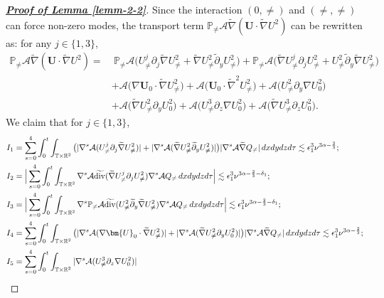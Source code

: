 \documentclass[11pt,reqno]{article}
\numberwithin{equation}{section}
\newcommand\R{{\mathbb R}}
\newcommand\T{{\mathbb T}}
\newcommand\PP{{\mathbb P}}
\newcommand\A{\mathcal{A}}
\newcommand\U{\bm{U}}
\let\pa=\partial
\let\al=\alpha
\let\f=\frac
\let\ep=\epsilon
\def\dive{\mathop{\rm div}\nolimits}
\begin{document}
\begin{proof}[\underline{\textbf{Proof of Lemma \ref{lemm-2-2}}}]
Since the interaction $(0,\not=)$ and $(\not=,\not=)$ can force non-zero modes, the transport term $\PP_{\not=}\A\widetilde{\nabla}(\U\cdot\widetilde{\nabla}U^2)$ can be rewritten as: for any $j\in\{1,3\}$,
\begin{align*}
	\PP_{\not=}\A\widetilde{\nabla}(\U\cdot\widetilde{\nabla}U^2)
	=&~	\PP_{\not=}\A\big(U_{\not=}^j\pa_{j}\widetilde{\nabla}U_{\not=}^2
	+\widetilde{\nabla}U_{\not=}^2\widetilde{\pa}_y U_{\not=}^2\big)
	+\PP_{\not=}\A\big(\widetilde{\nabla}U_{\not=}^j\pa_{j}U_{\not=}^2
	+U_{\not=}^2\widetilde{\pa}_y \widetilde{\nabla}U_{\not=}^2\big)
	\\
	&+\A\big(\nabla \U_0\cdot \widetilde{\nabla}U_{\not=}^2\big)
	+\A\big(\U_0\cdot \widetilde{\nabla}^2U_{\not=}^2\big)
	+\A\big(U_{\not=}^2\pa_y \nabla U_{0}^2\big)
	\\
	&+\A\big(\widetilde{\nabla}U_{\not=}^2\pa_y U_{0}^2\big)
	+\A\big(U_{\not=}^3\pa_z \nabla U_{0}^2\big)
	+\A\big(\widetilde{\nabla}U_{\not=}^3\pa_z U_{0}^2\big).
\end{align*}
We claim that for $j\in\{1,3\}$,
\begin{align}
	&I_1=\sum_{s=0}^{4}
	\int_0^t\int_{\T\times\R^2}
	\big( |\nabla^s\A(U_{\not=}^j\pa_{j}\widetilde{\nabla}U_{\not=}^2)| 
	+|\nabla^s\A(\widetilde{\nabla}U_{\not=}^2\widetilde{\pa}_y U_{\not=}^2)| 
	\big)
	|\nabla^s\A\widetilde{\nabla}Q_{\not=}|\,dxdydzd\tau
	\lesssim \ep_1^3\nu^{3\al-\f23};
	\label{est-4.6-1}
	\\
	&I_2=\Big|\sum_{s=0}^{4}
	\int_0^t\int_{\T\times\R^2}
	\nabla^s\A\widetilde{\dive}(\widetilde{\nabla}U_{\not=}^j\pa_{j}U_{\not=}^2) 
	\nabla^s\A Q_{\not=} \,dxdydzd\tau \Big|
	\lesssim \ep_1^3\nu^{3\al-\f23-\delta_1};
	\label{est-4.6-2}
	\\
	&I_3=\Big|\sum_{s=0}^{4}
	\int_0^t\int_{\T\times\R^2}
	\nabla^s\PP_{\not=}\A\widetilde{\dive}( U_{\not=}^2\widetilde{\pa}_y\widetilde{\nabla}U_{\not=}^2)
	\nabla^s\A Q_{\not=}\,dxdydzd\tau \Big|
	\lesssim \ep_1^3\nu^{3\al-\f23-\delta_1};
	\label{est-4.6-2-1}
	\\
	&I_4=\sum_{s=0}^{4}
	\int_0^t\int_{\T\times\R^2}
	\big( |\nabla^s\A(\nabla \U_0\cdot \widetilde{\nabla}U_{\not=}^2)| 
	+|\nabla^s\A(\widetilde{\nabla}U_{\not=}^2\pa_y U_{0}^2)| 
	\big)
	|\nabla^s\A\widetilde{\nabla}Q_{\not=}|\,dxdydzd\tau
	\lesssim \ep_1^3\nu^{3\al-\f23};
	\label{est-4.6-3}
	\\
	&I_5=\sum_{s=0}^{4}
	\int_0^t\int_{\T\times\R^2}
	|\nabla^s\A(U_{\not=}^3\pa_z \nabla U_{0}^2)| 

\end{align}
\end{proof}
\end{document}
